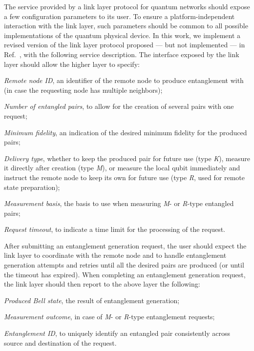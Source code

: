 The service provided by a link layer protocol for quantum networks should expose a few configuration
parameters to its user. To ensure a platform-independent interaction with the link layer, such
parameters should be common to all possible implementations of the quantum physical device. In this
work, we implement a revised version of the link layer protocol proposed --- but not implemented ---
in Ref.~\cite{dahlberg_2019_egp}, with the following service description. The interface exposed by
the link layer should allow the higher layer to specify:
%
\begin{enumerate*}[label=(\alph*)]
    \item \emph{Remote node ID}, an identifier of the remote node to produce entanglement with (in
          case the requesting node has multiple neighbors);
    \item \emph{Number of entangled pairs}, to allow for the creation of several pairs with one
          request;
    \item \emph{Minimum fidelity}, an indication of the desired minimum fidelity for the produced
          pairs;
    \item \emph{Delivery type}, whether to keep the produced pair for future use (type \emph{K}),
          measure it directly after creation (type \emph{M}), or measure the local qubit immediately
          and instruct the remote node to keep its own for future use (type \emph{R}, used for
          remote state preparation);
    \item \emph{Measurement basis}, the basis to use when measuring \emph{M}- or \emph{R}-type
          entangled pairs;
    \item \emph{Request timeout}, to indicate a time limit for the processing of the request.
\end{enumerate*}
After submitting an entanglement generation request, the user should expect the link layer to
coordinate with the remote node and to handle entanglement generation attempts and retries until all
the desired pairs are produced (or until the timeout has expired). When completing an entanglement
generation request, the link layer should then report to the above layer the following:
%
\begin{enumerate*}[label=(\alph*)]
    \item \emph{Produced Bell state}, the result of entanglement generation;
    \item \emph{Measurement outcome}, in case of \emph{M}- or \emph{R}-type entanglement requests;
    \item \emph{Entanglement ID}, to uniquely identify an entangled pair consistently across source
          and destination of the request.
\end{enumerate*}

